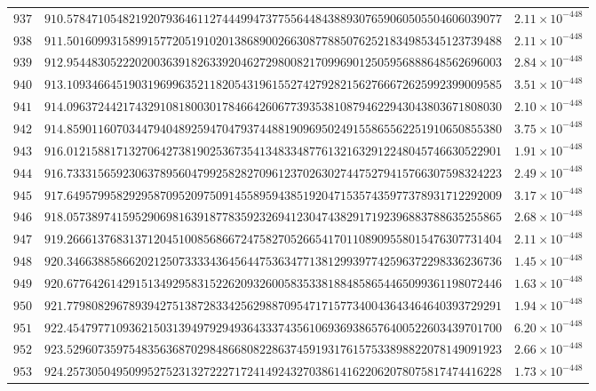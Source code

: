 \documentclass[12pt,reqno]{amsart}
\theoremstyle{remark}
\begin{document}
\begin{longtable}{clc}
$937$ & $910.5784710548219207936461127444994737755644843889307659060505504606039077$ & $2.11\times 10^{-448}$ \\
$938$ & $911.5016099315899157720519102013868900266308778850762521834985345123739488$ & $2.11\times 10^{-448}$ \\
$939$ & $912.9544830522202003639182633920462729800821709969012505956888648562696003$ & $2.84\times 10^{-448}$ \\
$940$ & $913.1093466451903196996352118205431961552742792821562766672625992399009585$ & $3.51\times 10^{-448}$ \\
$941$ & $914.0963724421743291081800301784664260677393538108794622943043803671808030$ & $2.10\times 10^{-448}$ \\
$942$ & $914.8590116070344794048925947047937448819096950249155865562251910650855380$ & $3.75\times 10^{-448}$ \\
$943$ & $916.0121588171327064273819025367354134833487761321632912248045746630522901$ & $1.91\times 10^{-448}$ \\
$944$ & $916.7333156592306378956047992582827096123702630274475279415766307598324223$ & $2.49\times 10^{-448}$ \\
$945$ & $917.6495799582929587095209750914558959438519204715357435977378931712292009$ & $3.17\times 10^{-448}$ \\
$946$ & $918.0573897415952906981639187783592326941230474382917192396883788635255865$ & $2.68\times 10^{-448}$ \\
$947$ & $919.2666137683137120451008568667247582705266541701108909558015476307731404$ & $2.11\times 10^{-448}$ \\
$948$ & $920.3466388586620212507333343645644753634771381299397742596372298336236736$ & $1.45\times 10^{-448}$ \\
$949$ & $920.6776426142915134929583152262093260058353381884858654465099361198072446$ & $1.63\times 10^{-448}$ \\
$950$ & $921.7798082967893942751387283342562988709547171577340043643464640393729291$ & $1.94\times 10^{-448}$ \\
$951$ & $922.4547977109362150313949792949364333743561069369386576400522603439701700$ & $6.20\times 10^{-448}$ \\
$952$ & $923.5296073597548356368702984866808228637459193176157533898822078149091923$ & $2.66\times 10^{-448}$ \\
$953$ & $924.2573050495099527523132722271724149243270386141622062078075817474416228$ & $1.73\times 10^{-448}$ \\

\end{longtable}
\end{document}
